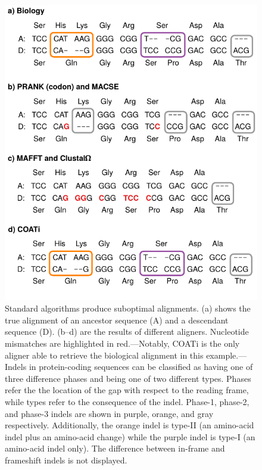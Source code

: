 \documentclass[12pt,letterpaper]{article}
\begin{document}
\begin{figure}[h!]
    \centering%
    \includegraphics[scale=1]{figures/fig-aln.pdf}
    \par
    \caption{
        Standard algorithms produce suboptimal alignments.
        (a) shows the true alignment of an ancestor sequence (A) and a descendant sequence (D).
        (b--d) are the results of different aligners. Nucleotide mismatches are highlighted in red.---Notably, COATi is the only aligner able to retrieve the biological alignment in this example.---%
        Indels in protein-coding sequences can be classified as having one of three difference phases and being one of two different types.
        Phases refer the the location of the gap with respect to the reading frame, while types refer to the consequence of the indel.
        Phase-1, phase-2, and phase-3 indels are shown in purple, orange, and gray respectively.
        Additionally, the orange indel is type-II (an amino-acid indel plus an amino-acid change) while the purple indel is type-I (an amino-acid indel only). The difference between in-frame and frameshift indels is not displayed.
        }
    \label{fig:aln}
\end{figure}
\end{document}
